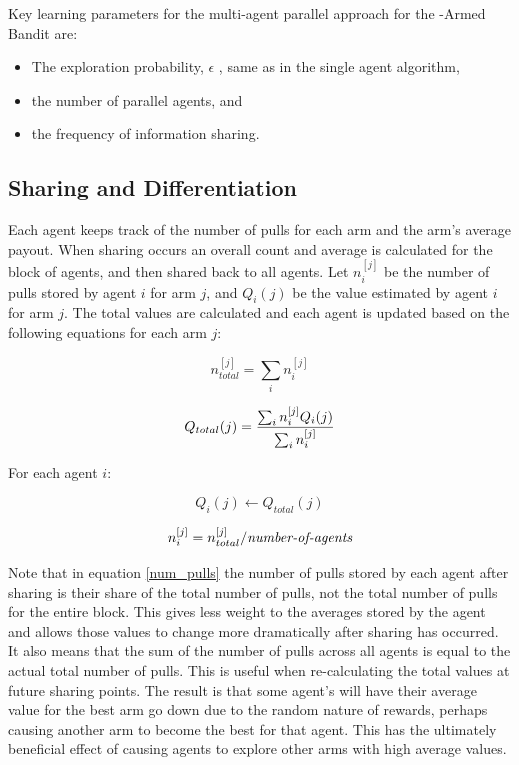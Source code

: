 \begin{flushleft}

Key learning parameters for the multi-agent parallel approach for the  -Armed Bandit are:

\begin{itemize}
\item
The exploration probability, $\epsilon$ , same as in the single agent algorithm,
\item
the number of parallel agents, and
\item
the frequency of information sharing.
\end{itemize}

\subsection{Sharing and Differentiation}
Each agent keeps track of the number of pulls for each arm and the arm’s average payout.  When sharing occurs an overall count and average is calculated for the block of agents, and then shared back to all agents.  Let $n_i^{[j]}$ be the number of pulls stored by agent $i$ for arm $j$, and $Q_i(j)$ be the value estimated by agent $i$ for arm $j$.  The total values are calculated and each agent is updated based on the following equations for each arm $j$:

\begin{equation}
n_{total}^{[j]}=\sum_in_i^{[j]}
\end{equation}

\begin{equation}
Q_{total}(j)={ {\sum_in_i^{[j]}Q_i(j)} \over {\sum_in_i^{[j]}}}
\end{equation}

For each agent $i$:

\begin{equation}
Q_i(j) \gets Q_{total}(j)
\end{equation}

\begin{equation}
n_i^{[j]} = n_{total}^{[j]}/\mbox{\it number-of-agents} \label{num_pulls}
\end{equation}

Note that in equation \eqref{num_pulls} the number of pulls stored by each agent after sharing is their share of the total number of pulls, not the total number of pulls for the entire block.  This gives less weight to the averages stored by the agent and allows those values to change more dramatically after sharing has occurred.  It also means that the sum of the number of pulls across all agents is equal to the actual total number of pulls.  This is useful when re-calculating the total values at future sharing points.  The result is that some agent's will have their average value for the best arm go down due to the random nature of rewards, perhaps causing another arm to become the best for that agent.  This has the ultimately beneficial effect of causing agents to explore other arms with high average values.


\end{flushleft}
